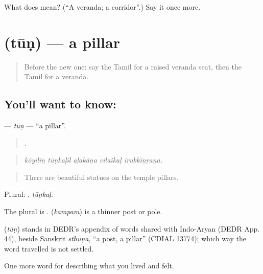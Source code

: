 \begin{tcolorbox}[breakable,colback=teal!4,colframe=teal!35!black,title={Before you move on}]
What does  mean? (\textquotedblleft{}A veranda; a corridor\textquotedblright{}.) Say it once more.
\end{tcolorbox}
\section[\texorpdfstring{\ta{தூண்} (tūṇ)}{தூண் (tūṇ)}]{ (tūṇ) — a pillar}

\label{lesson:TA-C522-tun}



\begin{quote}
Before the new one: say the Tamil for a raised veranda seat, then the Tamil for a veranda.
\end{quote}

\subsection*{You'll want to know: }
\textbf{} — \emph{tūṇ} — \textquotedblleft{}a pillar\textquotedblright{}.

\begin{quote}
    .
\end{quote}

\begin{quote}
\emph{kōyiliṉ tūṇkaḷil aḻakāṉa cilaikaḷ irukkiṉṟaṉa.}
\end{quote}

\begin{quote}
There are beautiful statues on the temple pillars.
\end{quote}

Plural: , \emph{tūṇkaḷ}.

The plural is .  (\emph{kampam}) is a thinner post or pole.

\begin{cousinweb}
\textbf{} (\emph{tūṇ}) stands in DEDR's appendix of words shared with Indo-Aryan (DEDR App. 44), beside Sanskrit \emph{sthūṇā}, \textquotedblleft{}a post, a pillar\textquotedblright{} (CDIAL 13774); which way the word travelled is not settled.
\end{cousinweb}

\begin{grammarlens}[title={What you've built}]
One more word for describing what you lived and felt.
\end{grammarlens}


